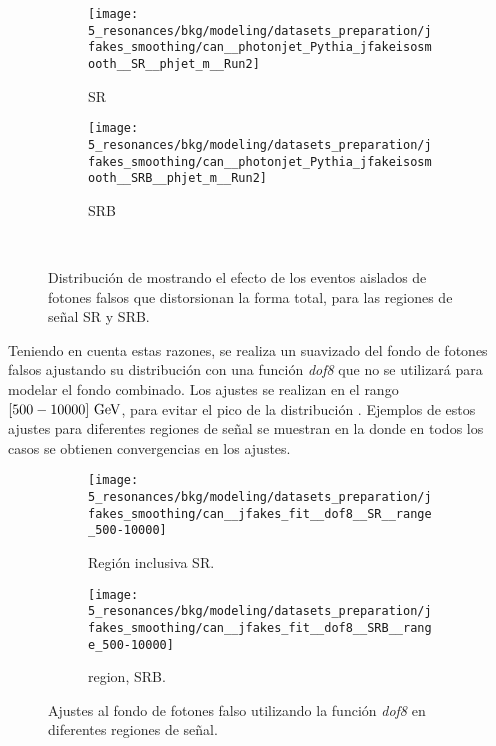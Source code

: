 \begin{figure}[ht!]
    \centering
    \begin{subfigure}[h]{0.49\linewidth}
        \centering
        \texttt{[image: 5\_resonances/bkg/modeling/datasets\_preparation/jfakes\_smoothing/can\_\_photonjet\_Pythia\_jfakeisosmooth\_\_SR\_\_phjet\_m\_\_Run2]}
        \caption{SR}
    \end{subfigure}
    \hfill
    \begin{subfigure}[h]{0.49\linewidth}
        \centering
        \texttt{[image: 5\_resonances/bkg/modeling/datasets\_preparation/jfakes\_smoothing/can\_\_photonjet\_Pythia\_jfakeisosmooth\_\_SRB\_\_phjet\_m\_\_Run2]}
        \caption{SRB}
    \end{subfigure}\\
    \caption{Distribución de \myj mostrando el efecto de los eventos aislados de fotones falsos que distorsionan la forma total, para las regiones de señal SR y SRB.}
    \label{fig:bkg:modeling:preparation:jfakes_smooth:bkg_myj_distribution}
\end{figure}

Teniendo en cuenta estas razones, se realiza un suavizado del fondo de fotones falsos ajustando su distribución \myj con una función \textit{dof8} que no se utilizará para modelar el fondo combinado.
Los ajustes se realizan en el rango \([500-10000]~\text{GeV}\), para evitar el pico de la distribución \myj. Ejemplos de estos ajustes para diferentes regiones de señal se muestran en la \Fig{\ref{fig:bkg:modeling:preparation:jfakes_smooth:jfakes_fits}} donde en todos los casos se obtienen convergencias en los ajustes.

\begin{figure}[ht!]
    \centering
    \begin{subfigure}[h]{0.49\linewidth}
        \centering
        \texttt{[image: 5\_resonances/bkg/modeling/datasets\_preparation/jfakes\_smoothing/can\_\_jfakes\_fit\_\_dof8\_\_SR\_\_range\_500-10000]}
        \caption{Región inclusiva SR.}
    \end{subfigure}
    \hfill
    \begin{subfigure}[h]{0.49\linewidth}
        \centering
        \texttt{[image: 5\_resonances/bkg/modeling/datasets\_preparation/jfakes\_smoothing/can\_\_jfakes\_fit\_\_dof8\_\_SRB\_\_range\_500-10000]}
        \caption{\btag region, SRB.}
    \end{subfigure}
    \caption{Ajustes al fondo de fotones falso utilizando la función \textit{dof8} en diferentes regiones de señal.}
    \label{fig:bkg:modeling:preparation:jfakes_smooth:jfakes_fits}
\end{figure}

